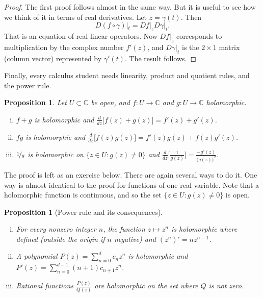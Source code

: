 \documentclass[12pt,openany]{book}
\newcommand{\C}{{\mathbb{C}}}
\theoremstyle{plain}
\newtheorem{prop}[thm]{Proposition}
\theoremstyle{remark}
\theoremstyle{definition}
\theoremstyle{exercise}
\theoremstyle{example}
\begin{document}
\begin{proof}
The first proof follows almost in the same way.  But it is useful to see
how we think of it in terms of real derivatives.
Let $z = \gamma(t)$.  Then 
\begin{equation*}
D(f \circ \gamma)|_{t} =
Df|_z D\gamma|_{t} .
\end{equation*}
That is an equation of real linear operators.  Now $Df|_z$ corresponds
to multiplication by the complex number $f'(z)$, and $D\gamma|_{t}$
is the $2 \times 1$ matrix (column vector) represented by $\gamma'(t)$.
The result follows.
\end{proof}

Finally, every calculus student needs linearity, product and quotient rules,
and the power rule.

\begin{prop} \label{prop:sumproddiv}
Let $U \subset \C$ be open, and $f \colon U \to \C$ and
$g \colon U \to \C$ holomorphic.
\begin{enumerate}[(i)]
\item
$f+g$ is holomorphic and $\frac{d}{dz}\bigl[ f(z)+g(z) \bigr] = f'(z) + g'(z)$.
\item
$fg$ is holomorphic and $\frac{d}{dz}\bigl[f(z) g(z) \bigr] = f'(z)g(z) + f(z)g'(z)$.
\item
$\nicefrac{1}{g}$ is holomorphic on $\bigl\{ z \in U : g(z) \not= 0 \bigr\}$ and
$\frac{d}{dz}\bigl[\frac{1}{g(z)}\bigr] = \frac{-g'(z)}{{\bigl(g(z)\bigr)}^2}$.
\end{enumerate}
\end{prop}

The proof is left as an exercise below.  There are again several ways
to do it.  One way is almost identical to the
proof for functions of one real variable.
Note that
a holomorphic function is continuous, and so the set
$\bigl\{ z \in U : g(z) \not= 0 \bigr\}$ is open.

\begin{prop}[Power rule and its consequences] \label{prop:powerrule}
\leavevmode
\begin{enumerate}[(i)]
\item For every nonzero integer $n$, the function $z \mapsto z^n$ is holomorphic
where defined (outside the origin if $n$ negative) and $(z^n)' = n z^{n-1}$.
\item
A polynomial $P(z) = \sum_{n=0}^d c_n z^n$ is
holomorphic and
$P'(z) = \sum_{n=0}^{d-1} (n+1) c_{n+1} z^n$.
\item Rational functions $\frac{P(z)}{Q(z)}$
are holomorphic on the set where $Q$ is not zero.
\end{enumerate}
\end{prop}
\end{document}
